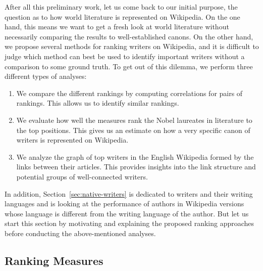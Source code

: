 \documentclass[a4paper,12pt]{scrartcl}
\begin{document}
After all this preliminary work, let us come back to our initial
purpose, the question as to how world literature is represented on
Wikipedia. On the one hand, this means we want to get a fresh
look at world literature without necessarily comparing the results to
well-established canons. On the other hand, we propose several methods
for ranking writers on Wikipedia, and it is difficult to judge which
method can best be used to identify important writers without a
comparison to some ground truth.
%
To get out of this dilemma, we perform three different types of analyses:
\begin{enumerate}
\item We compare the different rankings by computing correlations
  for pairs of rankings. This allows us to identify similar rankings.
\item We evaluate how well the measures rank the Nobel laureates in
  literature to the top positions. This gives us an estimate on how
  a very specific canon of writers is represented on Wikipedia.
\item We analyze the graph of top writers in the English Wikipedia
  formed by the links between their articles. This provides
  insights into the link structure and potential groups of
  well-connected writers.
\end{enumerate}
%
In addition, Section~\ref{sec:native-writers} is dedicated to writers
and their writing languages and is looking at the performance of
authors in Wikipedia versions whose language is different from the
writing language of the author.
% 
But let us start this section by motivating and explaining the
proposed ranking approaches before conducting the above-mentioned
analyses.


\subsection{Ranking Measures}\label{sec:ranking-measures}
\end{document}
